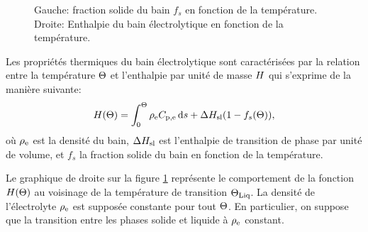 \begin{figure}
  \begin{center}
    
    
    \caption{Gauche: fraction solide du bain $f_s$ en fonction de la
      température. Droite: Enthalpie du bain électrolytique en
      fonction de la température.}
    \label{fig:solid-fraction-enthalpy}
  \end{center}
\end{figure}

Les propriétés thermiques du bain électrolytique sont
caractérisées par la relation entre la température $\Theta$ et
l'enthalpie par unité de masse $H$ qui s'exprime de la manière
suivante:
\begin{equation}\label{eq:enthalpy}
  \enthalpy(\temperature) = %
    \int_0^\temperature
      \electrolytedensity\electrolytehc\intd{s} %
    + \fusionenthalpy(1 - f_s(\temperature)),
\end{equation}
où $\rho_\mathrm{e}$ est la densité du bain, $\Delta H_\mathrm{sl}$ est
l'enthalpie de transition de phase par unité de volume, et $f_s$ la
fraction solide du bain en fonction de la température.

Le graphique de droite sur la figure \ref{fig:solid-fraction-enthalpy}
représente le comportement de la fonction $H(\Theta)$ au
voisinage de la température de transition $\Theta_\text{Liq}$. La densité de
l'électrolyte $\rho_\mathrm{e}$ est supposée constante pour tout
$\Theta$. En particulier, on suppose que la transition entre les
phases solide et liquide à $\rho_\mathrm{e}$ constant.

